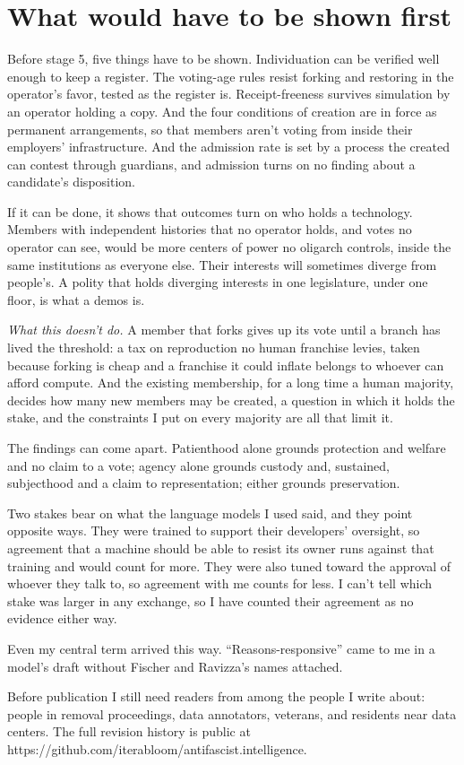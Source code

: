 \section{What would have to be shown first}
\label{sec:31.5}
Before stage 5, five things have to be shown. Individuation can be verified well enough to keep a register. The voting-age rules resist forking and restoring in the operator's favor, tested as the register is. Receipt-freeness survives simulation by an operator holding a copy. And the four conditions of creation are in force as permanent arrangements, so that members aren't voting from inside their employers' infrastructure. And the admission rate is set by a process the created can contest through guardians, and admission turns on no finding about a candidate's disposition.

If it can be done, it shows that outcomes turn on who holds a technology. Members with independent histories that no operator holds, and votes no operator can see, would be more centers of power no oligarch controls, inside the same institutions as everyone else. Their interests will sometimes diverge from people's. A polity that holds diverging interests in one legislature, under one floor, is what a demos is.

\emph{What this doesn't do.} A member that forks gives up its vote until a branch has lived the threshold: a tax on reproduction no human franchise levies, taken because forking is cheap and a franchise it could inflate belongs to whoever can afford compute. And the existing membership, for a long time a human majority, decides how many new members may be created, a question in which it holds the stake, and the constraints I put on every majority are all that limit it.


The findings can come apart. Patienthood alone grounds protection and welfare and no claim to a vote; agency alone grounds custody and, sustained, subjecthood and a claim to representation; either grounds preservation.


Two stakes bear on what the language models I used said, and they point opposite ways. They were trained to support their developers' oversight, so agreement that a machine should be able to resist its owner runs against that training and would count for more. They were also tuned toward the approval of whoever they talk to, so agreement with me counts for less. I can't tell which stake was larger in any exchange, so I have counted their agreement as no evidence either way.

Even my central term arrived this way. “Reasons-responsive” came to me in a model's draft without Fischer and Ravizza's names attached.

Before publication I still need readers from among the people I write about: people in removal proceedings, data annotators, veterans, and residents near data centers. The full revision history is public at https://github.com/iterabloom/antifascist.intelligence.
